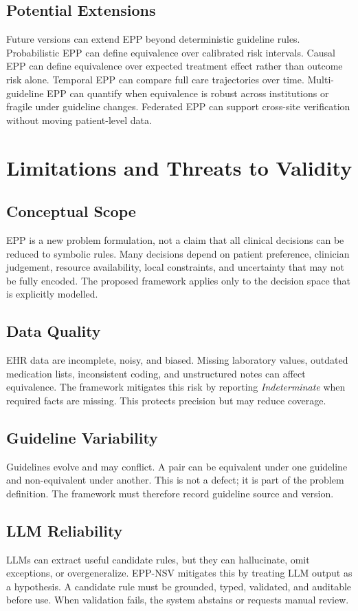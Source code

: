 \documentclass[english,5p,twocolumn,preprint]{elsarticle}
\begin{document}
\subsection{Potential Extensions}
Future versions can extend EPP beyond deterministic guideline rules. Probabilistic EPP can define equivalence over calibrated risk intervals. Causal EPP can define equivalence over expected treatment effect rather than outcome risk alone. Temporal EPP can compare full care trajectories over time. Multi-guideline EPP can quantify when equivalence is robust across institutions or fragile under guideline changes. Federated EPP can support cross-site verification without moving patient-level data.

\section{Limitations and Threats to Validity}
\subsection{Conceptual Scope}
EPP is a new problem formulation, not a claim that all clinical decisions can be reduced to symbolic rules. Many decisions depend on patient preference, clinician judgement, resource availability, local constraints, and uncertainty that may not be fully encoded. The proposed framework applies only to the decision space that is explicitly modelled.

\subsection{Data Quality}
EHR data are incomplete, noisy, and biased. Missing laboratory values, outdated medication lists, inconsistent coding, and unstructured notes can affect equivalence. The framework mitigates this risk by reporting \emph{Indeterminate} when required facts are missing. This protects precision but may reduce coverage.

\subsection{Guideline Variability}
Guidelines evolve and may conflict. A pair can be equivalent under one guideline and non-equivalent under another. This is not a defect; it is part of the problem definition. The framework must therefore record guideline source and version.

\subsection{LLM Reliability}
LLMs can extract useful candidate rules, but they can hallucinate, omit exceptions, or overgeneralize. EPP-NSV mitigates this by treating LLM output as a hypothesis. A candidate rule must be grounded, typed, validated, and auditable before use. When validation fails, the system abstains or requests manual review.
\end{document}
